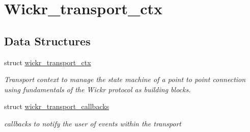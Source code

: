 \hypertarget{group__wickr__transport__ctx}{}\section{Wickr\+\_\+transport\+\_\+ctx}
\label{group__wickr__transport__ctx}
\subsection*{Data Structures}
\begin{DoxyCompactItemize}
\item 
struct \mbox{\hyperlink{structwickr__transport__ctx}{wickr\+\_\+transport\+\_\+ctx}}
\begin{DoxyCompactList}\small\item\em Transport context to manage the state machine of a point to point connection using fundamentals of the Wickr protocol as building blocks. \end{DoxyCompactList}\item 
struct \mbox{\hyperlink{structwickr__transport__callbacks}{wickr\+\_\+transport\+\_\+callbacks}}
\begin{DoxyCompactList}\small\item\em callbacks to notify the user of events within the transport \end{DoxyCompactList}\end{DoxyCompactItemize}
